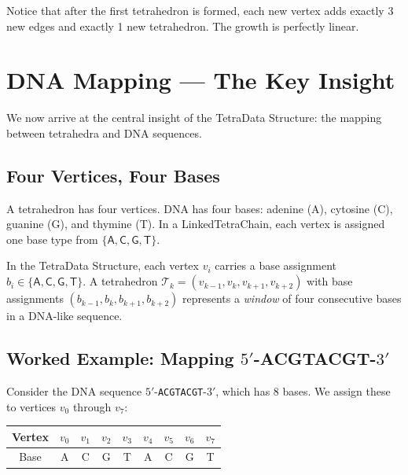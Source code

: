 Notice that after the first tetrahedron is formed, each new vertex adds exactly
3 new edges and exactly 1 new tetrahedron. The growth is perfectly linear.

\section{DNA Mapping --- The Key Insight}
\label{sec:dna-mapping}

We now arrive at the central insight of the TetraData Structure: the mapping
between tetrahedra and DNA sequences.

\subsection{Four Vertices, Four Bases}

A tetrahedron has four vertices. DNA has four bases: adenine (A), cytosine (C),
guanine (G), and thymine (T). In a LinkedTetraChain, each vertex is assigned
one base type from $\{\mathsf{A}, \mathsf{C}, \mathsf{G}, \mathsf{T}\}$.

\begin{dogmadef}
In the TetraData Structure, each vertex $v_i$ carries a base assignment
$b_i \in \{\mathsf{A}, \mathsf{C}, \mathsf{G}, \mathsf{T}\}$.
A tetrahedron $\mathcal{T}_k = (v_{k-1}, v_k, v_{k+1}, v_{k+2})$ with base
assignments $(b_{k-1}, b_k, b_{k+1}, b_{k+2})$ represents a \emph{window} of
four consecutive bases in a DNA-like sequence.
\end{dogmadef}

\subsection{Worked Example: Mapping \texorpdfstring{$5'$}{5'}-ACGTACGT-\texorpdfstring{$3'$}{3'}}

Consider the DNA sequence $5'$-\texttt{ACGTACGT}-$3'$, which has 8 bases. We
assign these to vertices $v_0$ through $v_7$:

\begin{center}
\renewcommand{\arraystretch}{1.15}
\begin{tabular}{ccccccccc}
\toprule
Vertex & $v_0$ & $v_1$ & $v_2$ & $v_3$ & $v_4$ & $v_5$ & $v_6$ & $v_7$ \\
\midrule
Base   & \textsf{A} & \textsf{C} & \textsf{G} & \textsf{T} & \textsf{A} & \textsf{C} & \textsf{G} & \textsf{T} \\
\bottomrule
\end{tabular}
\end{center}


